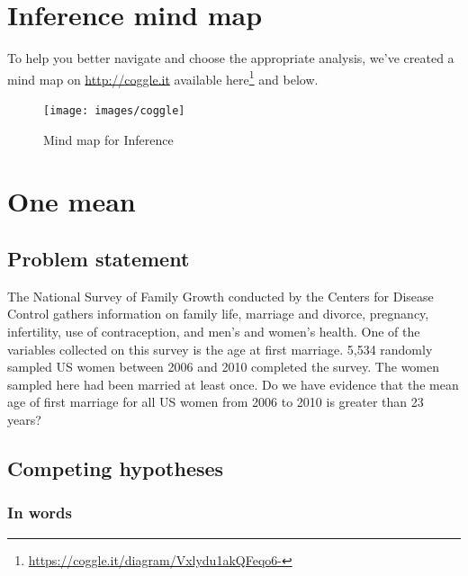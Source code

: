 \documentclass[12pt, krantz2,]{krantz}
\renewcommand{\href}[2]{#2\footnote{\url{#1}}}
\begin{document}
\hypertarget{inference-mind-map}{%
\section{Inference mind map}\label{inference-mind-map}}

To help you better navigate and choose the appropriate analysis, we've created a mind map on \url{http://coggle.it} available \href{https://coggle.it/diagram/Vxlydu1akQFeqo6-}{here} and below.

\begin{figure}

{\centering \texttt{[image: images/coggle]} 

}

\caption{Mind map for Inference}\label{fig:infer-map}
\end{figure}

\hypertarget{one-mean}{%
\section{One mean}\label{one-mean}}

\hypertarget{problem-statement}{%
\subsection{Problem statement}\label{problem-statement}}

The National Survey of Family Growth conducted by the
Centers for Disease Control gathers information on family life, marriage and divorce, pregnancy,
infertility, use of contraception, and men's and women's health. One of the variables collected on
this survey is the age at first marriage. 5,534 randomly sampled US women between 2006 and 2010 completed the survey. The women sampled here had been married at least once. Do we have evidence that the mean age of first marriage for all US women from 2006 to 2010 is greater than 23 years? \citep[Tweaked a bit from][ {[}Chapter 4{]}]{isrs2014}

\hypertarget{competing-hypotheses}{%
\subsection{Competing hypotheses}\label{competing-hypotheses}}

\hypertarget{in-words}{%
\subsubsection*{In words}\label{in-words}}
\end{document}
